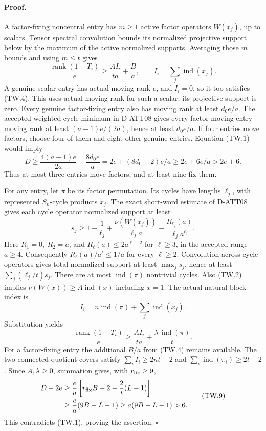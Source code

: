 \paragraph{Proof.}
A factor-fixing noncentral entry has \(m\ge1\) active factor operators
\(W(x_j)\), up to scalars.  Tensor spectral convolution bounds its normalized
projective support below by the maximum of the active normalized supports.
Averaging those \(m\) bounds and using \(m\le t\) gives
\[
 \frac{\operatorname{rank}(1-T_i)}e
 \ge \frac{A I_i}{ta}+\frac Ba ,
 \qquad I_i=\sum_j\operatorname{ind}(x_j).
 \tag{TW.4}
\]
A genuine scalar entry has actual moving rank \(e\), and \(I_i=0\), so it too
satisfies (TW.4).  This uses actual moving rank for such a scalar; its
projective support is zero.  Every genuine factor-fixing entry also has
moving rank at least \(d_0e/a\).
The accepted weighted-cycle minimum in D-ATT08 gives every factor-moving
entry moving rank at least \((a-1)e/(2a)\), hence at least \(d_0e/a\).
If four entries move factors, choose four of them and eight other genuine
entries.  Equation (TW.1) would imply
\[
 D\ge \frac{4(a-1)e}{2a}+\frac{8d_0e}a
   =2e+(8d_0-2)e/a
   \ge2e+6e/a>2e+6.
 \tag{TW.5}
\]
Thus at most three entries move factors, and at least nine fix them.

For any entry, let \(\pi\) be its factor permutation.  Its cycles have lengths
\(\ell_j\), with represented \(S_n\)-cycle products \(x_j\).  The exact
short-word estimate of D-ATT08 gives each cycle operator normalized support
at least
\[
 s_j\ge1-\frac1{\ell_j}
       +\frac{\nu(W(x_j))}{\ell_j a}
       -\frac{R_{\ell_j}(a)}{\ell_j a^{\ell_j}}.
 \tag{TW.6}
\]
Here \(R_1=0,\ R_2=a\), and
\(R_\ell(a)\le2a^{\ell-2}\) for \(\ell\ge3\), in the accepted range \(a\ge4\).
Consequently \(R_\ell(a)/a^\ell\le1/a\) for every \(\ell\ge2\).
Convolution across cycle operators gives total normalized support at least
\(\max_j s_j\), hence at least \(\sum_j(\ell_j/t)s_j\).
There are at most \(\operatorname{ind}(\pi)\) nontrivial cycles.
Also (TW.2) implies \(\nu(W(x))\ge A\operatorname{ind}(x)\) including \(x=1\).
The actual natural block index is
\[
 I_i=n\operatorname{ind}(\pi)+\sum_j\operatorname{ind}(x_j).
 \tag{TW.7}
\]
Substitution yields
\[
 \frac{\operatorname{rank}(1-T_i)}e
 \ge\frac{A I_i}{ta}
       +\frac{\lambda\,\operatorname{ind}(\pi)}t .
 \tag{TW.8}
\]
For a factor-fixing entry the additional \(B/a\) from (TW.4) remains available.
The two connected quotient covers satisfy
\(\sum_iI_i\ge2nt-2\) and
\(\sum_i\operatorname{ind}(\pi_i)\ge2t-2\).
Since \(A,\lambda\ge0\), summation gives, with \(r_{\rm fix}\ge9\),
\[
 \begin{split}
 D-2e
 &\ge\frac ea\left[r_{\rm fix}B-2-\frac2t(L-1)\right]\\
 &\ge\frac ea(9B-L-1)
 \ge a(9B-L-1)>6.
 \end{split}\tag{TW.9}
\]
This contradicts (TW.1), proving the assertion. \(\square\)


